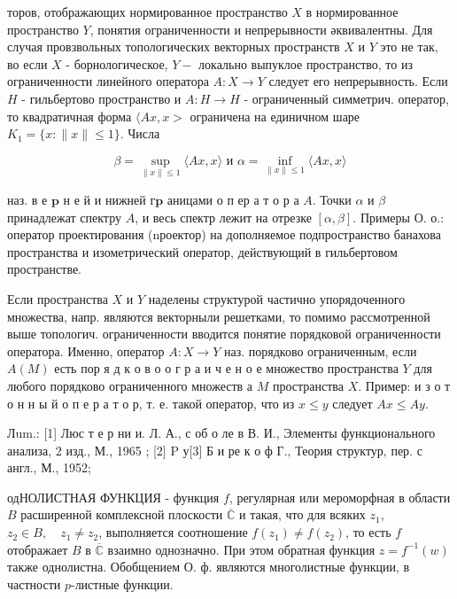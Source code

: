 \documentclass[10pt]{article}
\begin{document}
торов, отображающих нормированное пространство $X$ в нормированное пространство $Y$, понятия ограниченности и непрерывности әквивалентны. Для случая провзвольных топологических векторных пространств $X$ и $Y$ это не так, во если $X$ - борнологическое, $Y-$ локально выпуклое пространство, то из ограниченности линейного оператора $A: X \rightarrow Y$ следует его непрерывность. Если $H$ - гильбертово пространство и $A: H \rightarrow H$ - ограниченный симметрич. оператор, то квадратичная форма $\langle A x, x>$ ограничена на единичном шаре $K_{1}=\{x:\|x\| \leqslant 1\}$. Числа



\[

\beta=\sup _{\|x\| \leqslant 1}\langle A x, x\rangle \text { и } \alpha=\inf _{\|x\| \leqslant 1}\langle A x, x\rangle

\]



наз. в е $\mathbf{p}$ н е й и нижней $г \mathbf{p}$ аницами о п ер а т о р а $A$. Точки $\alpha$ и $\beta$ принадлежат спектру $A$, и весь спектр лежит на отрезке $[\alpha, \beta]$. Примеры О. о.: оператор проектирования (nроектор) на дополняемое подпространство банахова пространства и изометрический оператор, действующий в гильбертовом пространстве.



Если пространства $X$ и $Y$ наделены структурой частично упорядоченного множества, напр. являются векторныли решетками, то помимо рассмотренной выше топологич. ограниченности вводится понятие порядковой ограниченности оператора. Именно, оператор $A: X \rightarrow Y$ наз. порядково ограниченным, если $A(M)$ есть пор я д к о в о о г р а и ч е н о е множество пространства $Y$ для любого порядково ограниченного множеств а $M$ пространства $X$. Пример: и з о т о н н ы й о п е р а т о р, т. е. такой оператор, что из $x \leqslant y$ следует $A x \leqslant A y$.



Лum.: [1] Люс т е р ни и. Л. А., с об о ле в В. И., Элементы функционального анализа, 2 изд., М., 1965 ; [2] P у[3] Б и ре к о ф Г., Теория структур, пер. с англ., М., 1952;



одНОЛИСТНАЯ ФУНКЦИЯ - функция $f$, регулярная или мероморфная в области $B$ расширенной комплексной плоскости $\overline{\mathbb{C}}$ и такая, что для всяких $z_{1}$, $z_{2} \in B, \quad z_{1} \neq z_{2}$, выполняется соотношение $f\left(z_{1}\right) \neq f\left(z_{2}\right)$, то есть $f$ отображает $B$ в $\overline{\mathbb{C}}$ взаимно однозначно. При этом обратная функция $z=f^{-1}(w)$ также однолистна. Обобщением О. ф. являются многолистные функции, в частности $p$-листные функции.
\end{document}
